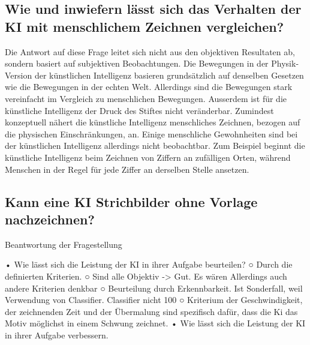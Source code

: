  
\subsection{Wie und inwiefern lässt sich das Verhalten der KI mit menschlichem Zeichnen vergleichen?}\label{subsub:d_frage_unter_5}
Die Antwort auf diese Frage leitet sich nicht aus den objektiven Resultaten ab,
sondern basiert auf subjektiven Beobachtungen. Die Bewegungen in der
Physik-Version der künstlichen Intelligenz basieren grundsätzlich auf denselben
Gesetzen wie die Bewegungen in der echten Welt. Allerdings sind die Bewegungen
stark vereinfacht im Vergleich zu menschlichen Bewegungen. Ausserdem ist für die
künstliche Intelligenz der Druck des Stiftes nicht veränderbar. Zumindest
konzeptuell nähert die künstliche Intelligenz menschliches Zeichnen,
bezogen auf die physischen Einschränkungen, an. Einige menschliche Gewohnheiten
sind bei der künstlichen Intelligenz allerdings nicht beobachtbar. Zum Beispiel
beginnt die künstliche Intelligenz beim Zeichnen von Ziffern an zufälligen
Orten, während Menschen in der Regel für jede Ziffer an derselben Stelle
ansetzen.


\subsection{Kann eine KI Strichbilder ohne Vorlage nachzeichnen?}\label{subsub:d_frage_unter_6} 














Beantwortung der Fragestellung
	
	• Wie lässt sich die Leistung der KI in ihrer Aufgabe beurteilen?
		○ Durch die definierten Kriterien. 
		○ Sind alle Objektiv -> Gut. Es wären Allerdings auch andere Kriterien denkbar
		○ Beurteilung durch Erkennbarkeit. Ist Sonderfall, weil Verwendung von Classifier. Classifier nicht 100%
		○ Kriterium der Geschwindigkeit, der zeichnenden Zeit und der Übermalung sind spezifisch dafür, dass die Ki das Motiv möglichst in einem Schwung zeichnet.
	• Wie lässt sich die Leistung der KI in ihrer Aufgabe verbessern. 
		
